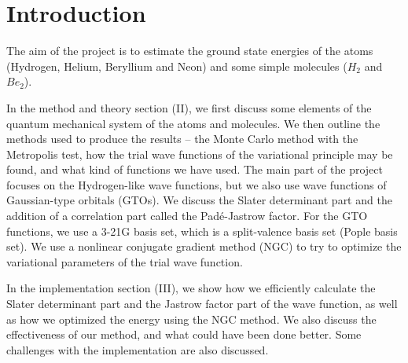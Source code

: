 \documentclass[twocolumns, a4paper,10pt,fleqn]{extarticle}
\title{}
\begin{document}

\section{Introduction} 
The aim of the project is to estimate the ground state energies of the
atoms (Hydrogen, Helium, Beryllium and Neon) and some simple molecules ($H_2$ and $Be_2$).

In the method and theory section (II), 
we first discuss some elements of the quantum mechanical system 
of the atoms and molecules.
We then outline the methods used to produce the results --
the Monte Carlo method with the Metropolis test, how the trial wave functions
of the variational principle may be found, and what kind of functions we have used.
The main part of the project focuses on the Hydrogen-like wave functions,
but we also use wave functions of Gaussian-type orbitals (GTOs).
We discuss the Slater determinant part and the addition of a
correlation part called the Pad\'e-Jastrow factor.
For the GTO functions, we use a 3-21G basis set, which is
a split-valence basis set (Pople basis set).
We use a nonlinear conjugate gradient method (NGC) to try to optimize the
variational parameters of the trial wave function.

In the implementation section (III), we show how we efficiently calculate the
Slater determinant part and the Jastrow factor part of the wave function,
as well as how we optimized the energy using the NGC method.
We also discuss the effectiveness of our method, and what could have been done better.
Some challenges with the implementation are also discussed.
\end{document}
